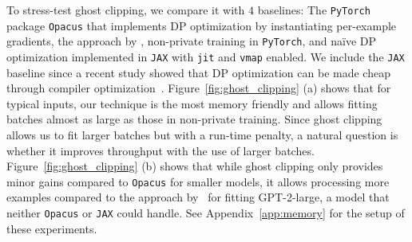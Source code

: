 To stress-test ghost clipping, we compare it with $4$ baselines: The \texttt{PyTorch} package \texttt{Opacus} that implements DP optimization by instantiating per-example gradients, the approach by \cite{lee2020scaling}, non-private training in \texttt{PyTorch}, and na\"ive DP optimization implemented in \texttt{JAX} with \texttt{jit} and \texttt{vmap} enabled. 
We include the \texttt{JAX} baseline since a recent study showed that DP optimization can be made cheap through compiler optimization~\citep{subramani2020enabling}.
Figure~\ref{fig:ghost_clipping} (a) shows that for typical inputs, our technique is the most memory friendly and allows fitting batches almost as large as those in non-private training. 
Since ghost clipping allows us to fit larger batches but with a run-time penalty, a natural question is whether it improves throughput with the use of larger batches. 
Figure~\ref{fig:ghost_clipping} (b) shows that while ghost clipping only provides minor gains compared to \texttt{Opacus} for smaller models, it allows processing  more examples compared to the approach by~\cite{lee2020scaling} for fitting GPT-2-large, a model that neither \texttt{Opacus} or \texttt{JAX} could handle. 
See Appendix~\ref{app:memory} for the setup of these experiments.

